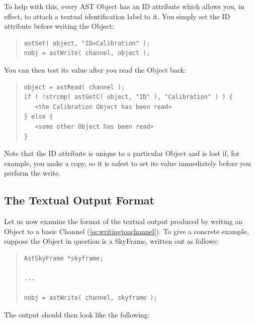 \documentclass[twoside,11pt]{article}
\newcommand{\htmlref}[2]{#1}
\newcommand{\secref}[1]{\S\ref{#1}}
\renewcommand{\secref}[1]{\ref{#1}}
\begin{document}
To help with this, every AST \htmlref{Object}{Object} has an \htmlref{ID}{ID} attribute which allows
you, in effect, to attach a textual identification label to it. You
simply set the ID attribute before writing the Object:

\begin{quote}
\small
\begin{verbatim}
astSet( object, "ID=Calibration" );
nobj = astWrite( channel, object );
\end{verbatim}
\normalsize
\end{quote}

You can then test its value after you read the Object back:

\begin{quote}
\small
\begin{verbatim}
object = astRead( channel );
if ( !strcmp( astGetC( object, "ID" ), "Calibration" ) ) {
   <the Calibration Object has been read>
} else {
   <some other Object has been read>
}
\end{verbatim}
\normalsize
\end{quote}

Note that the ID attribute is unique to a particular Object and
is lost if, for example, you make a copy, so it is safest to set its
value immediately before you perform the write.

\subsection{\label{ss:textualoutputformat}The Textual Output Format} 

Let us now examine the format of the textual output produced by
writing an \htmlref{Object}{Object} to a basic \htmlref{Channel}{Channel}
(\secref{ss:writingtoachannel}). To give a concrete example, suppose
the Object in question is a \htmlref{SkyFrame}{SkyFrame}, written out as follows:

\begin{quote}
\small
\begin{verbatim}
AstSkyFrame *skyframe;

...

nobj = astWrite( channel, skyframe );
\end{verbatim}
\normalsize
\end{quote}

The output should then look like the following:
\end{document}
